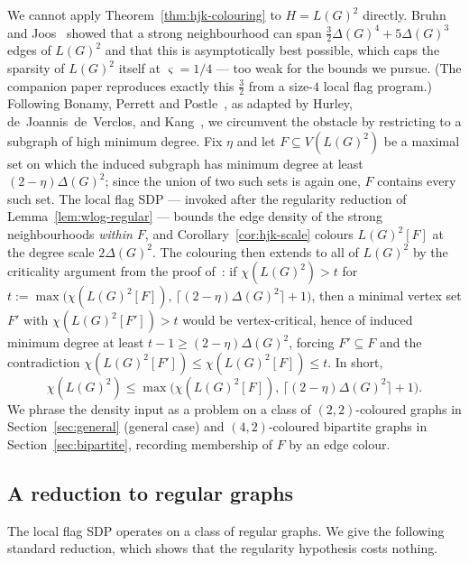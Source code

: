 \documentclass[11pt,a4paper]{article}
\theoremstyle{definition}
\theoremstyle{remark}
\begin{document}
We cannot apply Theorem~\ref{thm:hjk-colouring} to $H = L(G)^2$
directly. Bruhn and Joos~\cite{bruhnStrongerBoundStrong2018} showed
that a strong neighbourhood can span $\tfrac{3}{2}\Delta(G)^4 +
5\Delta(G)^3$ edges of $L(G)^2$ and that this is asymptotically best
possible, which caps the sparsity of $L(G)^2$ itself at
$\varsigma = 1/4$ --- too weak for the bounds we pursue. (The
companion paper reproduces exactly this $\tfrac{3}{2}$ from a size-$4$
local flag program.) Following Bonamy, Perrett and
Postle~\cite{bonamyColouringGraphsSparse2018}, as adapted by Hurley,
de~Joannis~de~Verclos, and Kang~\cite{hurleyImprovedProcedureColouring2022}, we circumvent the
obstacle by restricting to a subgraph of high minimum degree. Fix
$\eta$ and let $F \subseteq V(L(G)^2)$ be a maximal set on which the
induced subgraph has minimum degree at least $(2 - \eta)\Delta(G)^2$;
since the union of two such sets is again one, $F$ contains every
such set. The local flag SDP --- invoked after the regularity
reduction of Lemma~\ref{lem:wlog-regular} --- bounds the edge density
of the strong neighbourhoods \emph{within $F$}, and
Corollary~\ref{cor:hjk-scale} colours $L(G)^2[F]$ at the degree scale
$2\Delta(G)^2$. The colouring then extends to all of $L(G)^2$ by the
criticality argument from the proof
of~\cite[Theorem~1.6]{hurleyImprovedProcedureColouring2022}: if
$\chi(L(G)^2) > t$ for
$t := \max\bigl(\chi(L(G)^2[F]),\, \lceil(2 - \eta)\Delta(G)^2\rceil + 1\bigr)$,
then a minimal vertex set $F'$ with $\chi(L(G)^2[F']) > t$ would be
vertex-critical, hence of induced minimum degree at least
$t - 1 \geq (2 - \eta)\Delta(G)^2$, forcing $F' \subseteq F$ and the
contradiction $\chi(L(G)^2[F']) \leq \chi(L(G)^2[F]) \leq t$. In short,
\begin{equation}
\label{eq:criticality-lift}
\chi(L(G)^2)
\leq \max\bigl(\chi(L(G)^2[F]),\,
\lceil(2 - \eta)\Delta(G)^2\rceil + 1\bigr).
\end{equation}
We phrase the density input as a problem on a class of
$(2,2)$-coloured graphs in Section~\ref{sec:general} (general case)
and $(4,2)$-coloured bipartite graphs in
Section~\ref{sec:bipartite}, recording membership of $F$ by an edge
colour.

\subsection{A reduction to regular graphs}

The local flag SDP operates on a class of regular graphs. We give the
following standard reduction, which shows that the regularity
hypothesis costs nothing.
\end{document}
